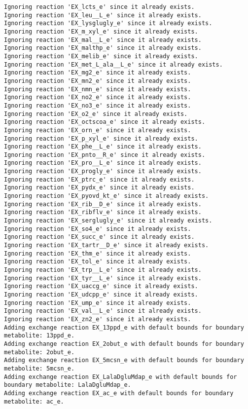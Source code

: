 \documentclass[
  letterpaper,
  DIV=11,
  numbers=noendperiod]{scrartcl}
\begin{document}
\begin{verbatim}
Ignoring reaction 'EX_lcts_e' since it already exists.
Ignoring reaction 'EX_leu__L_e' since it already exists.
Ignoring reaction 'EX_lysglugly_e' since it already exists.
Ignoring reaction 'EX_m_xyl_e' since it already exists.
Ignoring reaction 'EX_mal__L_e' since it already exists.
Ignoring reaction 'EX_malthp_e' since it already exists.
Ignoring reaction 'EX_melib_e' since it already exists.
Ignoring reaction 'EX_met_L_ala__L_e' since it already exists.
Ignoring reaction 'EX_mg2_e' since it already exists.
Ignoring reaction 'EX_mn2_e' since it already exists.
Ignoring reaction 'EX_nmn_e' since it already exists.
Ignoring reaction 'EX_no2_e' since it already exists.
Ignoring reaction 'EX_no3_e' since it already exists.
Ignoring reaction 'EX_o2_e' since it already exists.
Ignoring reaction 'EX_octscoa_e' since it already exists.
Ignoring reaction 'EX_orn_e' since it already exists.
Ignoring reaction 'EX_p_xyl_e' since it already exists.
Ignoring reaction 'EX_phe__L_e' since it already exists.
Ignoring reaction 'EX_pnto__R_e' since it already exists.
Ignoring reaction 'EX_pro__L_e' since it already exists.
Ignoring reaction 'EX_progly_e' since it already exists.
Ignoring reaction 'EX_ptrc_e' since it already exists.
Ignoring reaction 'EX_pydx_e' since it already exists.
Ignoring reaction 'EX_pyovd_kt_e' since it already exists.
Ignoring reaction 'EX_rib__D_e' since it already exists.
Ignoring reaction 'EX_ribflv_e' since it already exists.
Ignoring reaction 'EX_serglugly_e' since it already exists.
Ignoring reaction 'EX_so4_e' since it already exists.
Ignoring reaction 'EX_succ_e' since it already exists.
Ignoring reaction 'EX_tartr__D_e' since it already exists.
Ignoring reaction 'EX_thm_e' since it already exists.
Ignoring reaction 'EX_tol_e' since it already exists.
Ignoring reaction 'EX_trp__L_e' since it already exists.
Ignoring reaction 'EX_tyr__L_e' since it already exists.
Ignoring reaction 'EX_uaccg_e' since it already exists.
Ignoring reaction 'EX_udcpp_e' since it already exists.
Ignoring reaction 'EX_ump_e' since it already exists.
Ignoring reaction 'EX_val__L_e' since it already exists.
Ignoring reaction 'EX_zn2_e' since it already exists.
Adding exchange reaction EX_13ppd_e with default bounds for boundary metabolite: 13ppd_e.
Adding exchange reaction EX_2obut_e with default bounds for boundary metabolite: 2obut_e.
Adding exchange reaction EX_5mcsn_e with default bounds for boundary metabolite: 5mcsn_e.
Adding exchange reaction EX_LalaDgluMdap_e with default bounds for boundary metabolite: LalaDgluMdap_e.
Adding exchange reaction EX_ac_e with default bounds for boundary metabolite: ac_e.

\end{verbatim}
\end{document}
